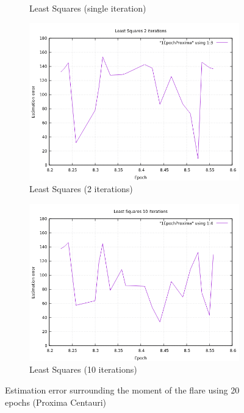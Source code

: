 \begin{figure}[!htb]
\begin{subfigure}[b]{0.5\textwidth}
		\caption{Least Squares (single iteration)}
	\end{subfigure}
	\hfill
	\begin{subfigure}[b]{0.5\textwidth}
		\includegraphics[width=\linewidth]{images/resultsStellar/20Epochs1Epoch/1EpochProximaLS2.png}
		\caption{Least Squares (2 iterations)}
	\end{subfigure}
	\hfill
	\begin{subfigure}[b]{0.5\textwidth}
		\includegraphics[width=\linewidth]{images/resultsStellar/20Epochs1Epoch/1EpochProximaLS10.png}
		\caption{Least Squares (10 iterations)}
	\end{subfigure}
	\caption{Estimation error surrounding the moment of the flare using 20 epochs (Proxima Centauri)}
	\label{fig:proximaCentauri1Epoch20}
\end{figure}

